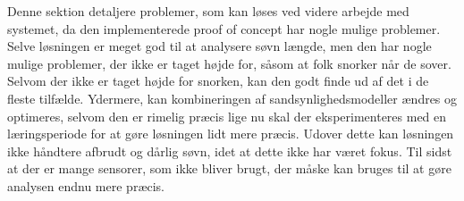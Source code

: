 Denne sektion detaljere problemer, som kan løses ved videre arbejde med systemet, da den implementerede proof of concept har nogle mulige problemer.
Selve løsningen er meget god til at analysere søvn længde, men den har nogle mulige problemer, der ikke er taget højde for, såsom at folk snorker når de sover.
Selvom der ikke er taget højde for snorken, kan den godt finde ud af det i de fleste tilfælde.
Ydermere, kan kombineringen af sandsynlighedsmodeller ændres og optimeres, selvom den er rimelig præcis lige nu skal der eksperimenteres med en læringsperiode for at gøre løsningen lidt mere præcis.
Udover dette kan løsningen ikke håndtere afbrudt og dårlig søvn, idet at dette ikke har været fokus.
Til sidst at der er mange sensorer, som ikke bliver brugt, der måske kan bruges til at gøre analysen endnu mere præcis.